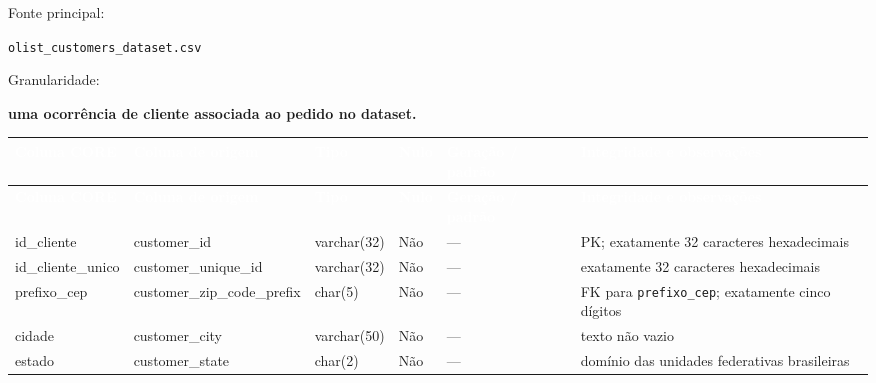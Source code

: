 \documentclass[12pt,a4paper]{article}
\begin{document}
	Fonte principal:
	
	\texttt{olist\_customers\_dataset.csv}
	
	Granularidade:
	
	\textbf{uma ocorrência de cliente associada ao pedido no dataset.}
	

		
	\small
	\renewcommand{\arraystretch}{1.18}
			
	\begin{longtable}{
			|>{\raggedright\arraybackslash}p{2.6cm}|
			>{\raggedright\arraybackslash}p{3.5cm}|
			>{\raggedright\arraybackslash}p{2cm}|
			>{\centering\arraybackslash}p{1cm}|
			>{\raggedright\arraybackslash}p{2cm}|
			>{\raggedright\arraybackslash}p{3cm}|
		}
				
		\hline
		\rowcolor{AzulCorporativo}
				
		\textcolor{white}{\textbf{Coluna CORE}} &
		\textcolor{white}{\textbf{Coluna de origem}} &
		\textcolor{white}{\textbf{Tipo}} &
		\textcolor{white}{\textbf{Nulo}} &
		\textcolor{white}{\textbf{Geração / padrão}} &
		\textcolor{white}{\textbf{Integridade e observações}}
		\\ \hline
				
		\endfirsthead
				
		\hline
		\rowcolor{AzulCorporativo}
				
		\textcolor{white}{\textbf{Coluna CORE}} &
		\textcolor{white}{\textbf{Coluna de origem}} &
		\textcolor{white}{\textbf{Tipo}} &
		\textcolor{white}{\textbf{Nulo}} &
		\textcolor{white}{\textbf{Geração / padrão}} &
		\textcolor{white}{\textbf{Integridade e observações}}
		\\ \hline
				
		\endhead
				
		id\_cliente
		&
		customer\_id
		&
		varchar(32)
		&
		Não
		&
		---
		&
		PK; exatamente 32 caracteres hexadecimais
		\\ \hline
				
		id\_cliente\_unico
		&
		customer\_unique\_id
		&
		varchar(32)
		&
		Não
		&
		---
		&
		exatamente 32 caracteres hexadecimais
		\\ \hline
				
		prefixo\_cep
		&
		customer\_zip\_code\_\allowbreak prefix
		&
		char(5)
		&
		Não
		&
		---
		&
		FK para \texttt{prefixo\_cep}; exatamente cinco dígitos
		\\ \hline
				
		cidade
		&
		customer\_city
		&
		varchar(50)
		&
		Não
		&
		---
		&
		texto não vazio
		\\ \hline
				
		estado
		&
		customer\_state
		&
		char(2)
		&
		Não
		&
		---
		&
		domínio das unidades federativas brasileiras
		\\ \hline
				
	\end{longtable}
	
\end{document}

